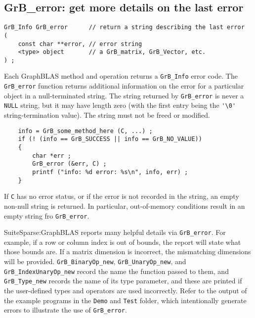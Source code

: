 \documentclass[12pt]{article}
\begin{document}
\newpage
\subsection{{\sf GrB\_error:} get more details on the last error} %
\label{error}

\begin{mdframed}[userdefinedwidth=6in]
{\footnotesize
\begin{verbatim}
GrB_Info GrB_error      // return a string describing the last error
( 
    const char **error, // error string
    <type> object       // a GrB_matrix, GrB_Vector, etc.
) ;
\end{verbatim}
}\end{mdframed}

Each GraphBLAS method and operation returns a \verb'GrB_Info' error code.  The
\verb'GrB_error' function returns additional information on the error for a
particular object in a null-terminated string.  The string returned by
\verb'GrB_error' is never a \verb'NULL' string, but it may have length zero
(with the first entry being the \verb"'\0'" string-termination value).  The
string must not be freed or modified.

    {\footnotesize
    \begin{verbatim}
    info = GrB_some_method_here (C, ...) ;
    if (! (info == GrB_SUCCESS || info == GrB_NO_VALUE))
    {
        char *err ;
        GrB_error (&err, C) ;
        printf ("info: %d error: %s\n", info, err) ;
    } \end{verbatim}}

If \verb'C' has no error status, or if the error is not recorded in
the string, an empty non-null string is returned.  In particular,
out-of-memory conditions result in an empty string fro \verb'GrB_error'.

SuiteSparse:GraphBLAS reports many helpful details via \verb'GrB_error'.  For
example, if a row or column index is out of bounds, the report will state what
those bounds are.  If a matrix dimension is incorrect, the mismatching
dimensions will be provided.  \verb'GrB_BinaryOp_new', \verb'GrB_UnaryOp_new',
and \verb'GrB_IndexUnaryOp_new' record the name the function passed to them, and
\verb'GrB_Type_new' records the name of its type parameter, and these are
printed if the user-defined types and operators are used incorrectly.  Refer to
the output of the example programs in the \verb'Demo' and \verb'Test' folder,
which intentionally generate errors to illustrate the use of \verb'GrB_error'.
\end{document}
